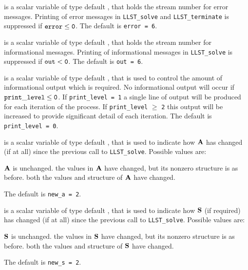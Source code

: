 \documentclass{galahad}
\newcommand{\packagename}{LLST}
\begin{document}
\begin{description}
 is a scalar variable of type default \integer, that holds the 
stream number for error messages. 
Printing of error messages in  
{\tt \packagename\_solve} and {\tt \packagename\_terminate} 
is suppressed if ${\tt error} \leq {\tt 0}$. 
The default is {\tt error = 6}.
 
 is a scalar variable of type default \integer, that holds the 
stream number for informational messages. 
Printing of informational messages in  
{\tt \packagename\_solve} is suppressed if ${\tt out} < {\tt 0}$. 
The default is {\tt out = 6}.
 
 is a scalar variable of type default \integer, 
that is used 
to control the amount of informational output which is required. No  
informational output will occur if ${\tt print\_level} \leq {\tt 0}$. If  
{\tt print\_level = 1} a single line of output will be produced for each 
iteration of the process. If {\tt print\_level} $\geq$ {\tt 2} this output 
will be increased to provide significant detail of each iteration. 
The default is {\tt print\_level = 0}.
 

 is a scalar variable of type default \integer, that is used
to indicate how ${\mathbf{A}}$ has changed (if at all) since the previous 
call to {\tt \packagename\_solve}. Possible values are:
\begin{description}
 ${\mathbf{A}}$ is unchanged.
 the values in ${\mathbf{A}}$ have changed, but its nonzero structure 
is as before.
 both the values and structure of ${\mathbf{A}}$ have changed.
\end{description}
The default is {\tt new\_a = 2}.

 is a scalar variable of type default \integer, that is used
to indicate how ${\mathbf{S}}$ (if required) has changed (if at all) since the previous 
call to {\tt \packagename\_solve}. Possible values are:
\begin{description}
 ${\mathbf{S}}$ is unchanged.
 the values in ${\mathbf{S}}$ have changed, but its nonzero structure 
is as before.
 both the values and structure of ${\mathbf{S}}$ have changed.
\end{description}
The default is {\tt new\_s = 2}.


\end{description}
\end{document}
